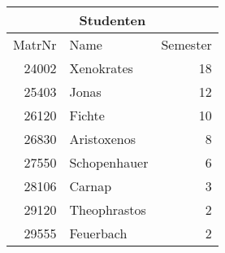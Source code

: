 {
\begin{tabular}[t]{|r|l|r|}
  \hline
  \multicolumn{3}{|c|}{Studenten}\\
  \hline
  MatrNr & Name & Semester\\
  \hline\hline
  24002 & Xenokrates & 18\\
  25403 & Jonas & 12\\
  26120 & Fichte & 10\\
  26830 & Aristoxenos & 8\\
  27550 & Schopenhauer & 6\\
  28106 & Carnap & 3\\
  29120 & Theophrastos & 2\\
  29555 & Feuerbach & 2\\
  \hline
\end{tabular}}

